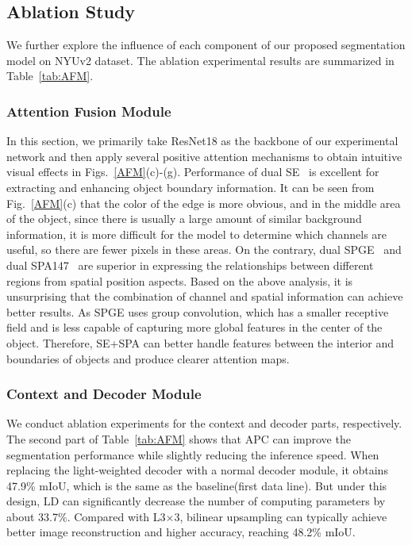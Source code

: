 \documentclass[journal,twoside,web]{ieeecolor}
\begin{document}
\subsection{Ablation Study}\label{sec:Ablation}
We further explore the influence of each component of our proposed segmentation model on NYUv2 dataset. The ablation experimental results are summarized in Table~\ref{tab:AFM}. 

\subsubsection{Attention Fusion Module} In this section, we primarily take ResNet18 as the backbone of our experimental network and then apply several positive attention mechanisms to obtain intuitive visual effects in Figs.~\ref{AFM}(c)-(g).
Performance of dual SE~\cite{SENet} is excellent for extracting and enhancing object boundary information. It can be seen from Fig.~\ref{AFM}(c) that the color of the edge is more obvious, and in the middle area of the object, since there is usually a large amount of similar background information, it is more difficult for the model to determine which channels are useful, so there are fewer pixels in these areas. On the contrary, dual SPGE~\cite{SpatialGE} and dual SPA147~\cite{spa} are superior in expressing the relationships between different regions from spatial position aspects. 
Based on the above analysis, it is unsurprising that the combination of channel and spatial information can achieve better results. As SPGE uses group convolution, which has a smaller receptive field and is less capable of capturing more global features in the center of the object. Therefore, SE+SPA can better handle features between the interior and boundaries of objects and produce clearer attention maps.


\subsubsection{Context and Decoder Module}
We conduct ablation experiments for the context and decoder parts, respectively. The second part of Table~\ref{tab:AFM} shows that APC can improve the segmentation performance while slightly reducing the inference speed. When replacing the light-weighted decoder with a normal decoder module, it obtains 47.9\% mIoU, which is the same as the baseline(first data line). But under this design, LD can significantly decrease the number of computing parameters by about 33.7$\%$. Compared with L3$\times$3, bilinear upsampling can typically achieve better image reconstruction and higher accuracy, reaching 48.2\% mIoU.
\end{document}
